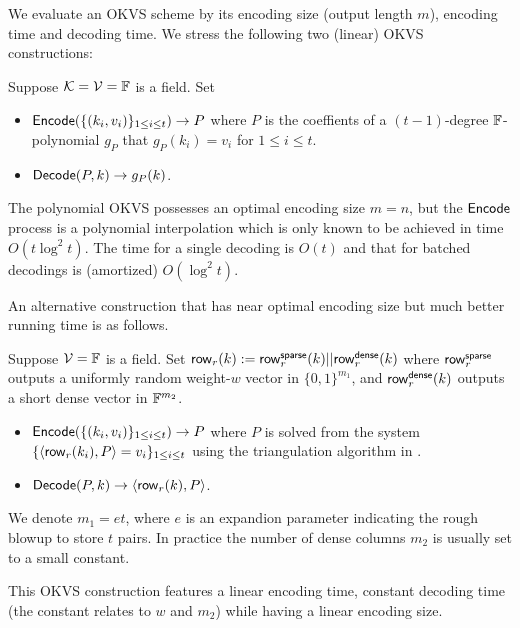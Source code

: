 We evaluate an OKVS scheme by its encoding size (output length $m$), encoding time and decoding time. We stress the following two (linear) OKVS constructions:
\begin{construction}[Polynomial]
  Suppose $\mathcal{K} = \mathcal{V}=\mathbb{F}$ is a field. Set 
  \begin{itemize}
    \item ${\sf Encode}(\{(k_i,v_i)\}_{1\le i\le t}) \rightarrow P$ where $P$ is the coeffients of a $(t-1)$-degree $\mathbb{F}$-polynomial $g_P$ that $g_P(k_i) = v_i$ for $1\le i\le t$. 
    \item ${\sf Decode}(P,k)\rightarrow g_P(k)$. 
  \end{itemize}
\end{construction}
The polynomial OKVS possesses an optimal encoding size $m=n$, but the ${\sf Encode}$ process is a polynomial interpolation which is only known to be achieved in time $O(t\log^2t)$. The time for a single decoding is $O(t)$ and that for batched decodings is (amortized) $O(\log^2 t)$. 

An alternative construction that has near optimal encoding size but much better running time is as follows. 
\begin{construction}
  Suppose $\mathcal{V}=\mathbb{F}$ is a field. Set ${\sf row}_r(k):={\sf row}_r^{\sf sparse}(k)||{\sf row}_r^{\sf dense}(k)$ where ${\sf row}_r^{\sf sparse}$ outputs a uniformly random weight-$w$ vector in $\{0,1\}^{m_1}$, and ${\sf row}_r^{\sf dense}(k)$ outputs a short dense vector in $\mathbb{F}^{m_2}$. 
  \begin{itemize}
    \item ${\sf Encode}(\{(k_i,v_i)\}_{1\le i\le t}) \rightarrow P$ where $P$ is solved from the system $\{\langle {\sf row}_r(k_i), P \rangle = v_i\}_{1\le i\le t}$ using the triangulation algorithm in \cite{cryptoeprint:2022/320}. 
    \item ${\sf Decode}(P,k)\rightarrow \langle {\sf row}_r(k), P \rangle$. 
  \end{itemize}
  We denote $m_1=et$, where $e$ is an expandion parameter indicating the rough blowup to store $t$ pairs. In practice the number of dense columns $m_2$ is usually set to a small constant. 
\end{construction}
This OKVS construction features a linear encoding time, constant decoding time (the constant relates to $w$ and $m_2$) while having a linear encoding size. 


